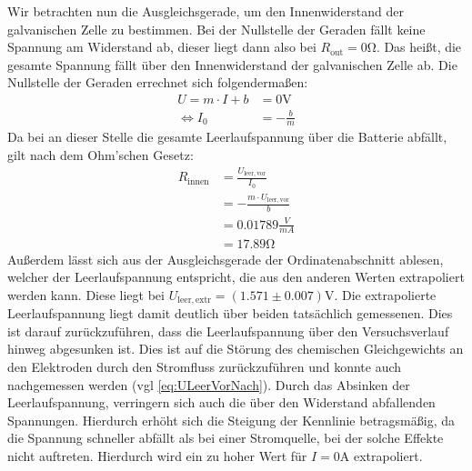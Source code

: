 \documentclass{report}
\begin{document}
Wir betrachten nun die Ausgleichsgerade, um den Innenwiderstand der galvanischen Zelle zu bestimmen.
Bei der Nullstelle der Geraden fällt keine Spannung am Widerstand ab, dieser liegt dann also bei $R_{\mathrm{out}} = 0 \si{\ohm}$. Das heißt, die gesamte Spannung fällt über 
den Innenwiderstand der galvanischen Zelle ab. 
Die Nullstelle der Geraden errechnet sich folgendermaßen:
\begin{equation}
    \begin{split}
        U = m \cdot I + b &= 0 \si{\volt} \\
        \Leftrightarrow I_0 &= - \frac{b}{m}
    \end{split}
\end{equation}
Da bei an dieser Stelle die gesamte Leerlaufspannung über die Batterie abfällt, gilt nach dem Ohm'schen Gesetz:
\begin{equation}
    \begin{split}
        R_{\mathrm{innen}}  &= \frac{U_{\mathrm{leer, vor}}}{I_0} \\
                            &= - \frac{m \cdot U_{\mathrm{leer, vor}}}{b} \\
                            &= 0.01789 \frac{\si{V}}{\si{mA}} \\
                            &= 17.89 \si{\ohm}
    \end{split}
\end{equation}
Außerdem lässt sich aus der Ausgleichsgerade der Ordinatenabschnitt ablesen, welcher der Leerlaufspannung entspricht, die aus den anderen Werten extrapoliert werden kann. 
Diese liegt bei $U_{\mathrm{leer, extr}} = (1.571 \pm 0.007) \si{\volt}$. Die extrapolierte Leerlaufspannung liegt damit deutlich über beiden tatsächlich gemessenen. 
Dies ist darauf zurückzuführen, dass die Leerlaufspannung über den Versuchsverlauf hinweg abgesunken ist. Dies ist auf die Störung des chemischen Gleichgewichts an 
den Elektroden durch den Stromfluss zurückzuführen und konnte auch nachgemessen werden (vgl \ref{eq:ULeerVorNach}). Durch das Absinken der Leerlaufspannung, verringern 
sich auch die über den Widerstand abfallenden Spannungen. Hierdurch erhöht sich die Steigung der Kennlinie betragsmäßig, da die Spannung schneller abfällt als bei einer
Stromquelle, bei der solche Effekte nicht auftreten. Hierdurch wird ein zu hoher Wert für $I = 0 \si{\ampere}$ extrapoliert.
\end{document}
